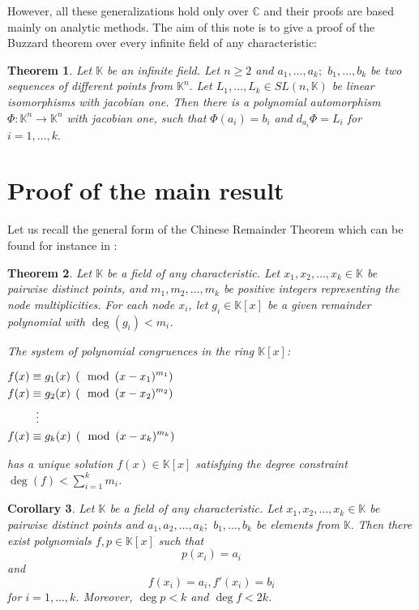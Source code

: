 \documentclass{amsart}
\newtheorem{theorem}{Theorem}[section]
\newtheorem{corollary}[theorem]{Corollary}
\newcommand{\C}{\mathbb{C}}
\newcommand{\K}{\mathbb{K}}
\begin{document}
However, all these generalizations hold only over $\C$ and their proofs are based mainly on analytic methods. The aim of this note is to give a proof of the Buzzard theorem over every
infinite field of any characteristic: \newpage


\begin{theorem}\label{glowne}
Let $\K$ be an infinite field. Let  $n\ge 2$ and $a_1,\ldots, a_k; $ $b_1,\ldots , b_k$ be two sequences of different points from $\K^n.$ Let $L_1,\ldots, L_k\in SL(n,\K)$ be linear isomorphisms with 
jacobian one. 
Then there is a polynomial automorphism $\Phi: \K^n\to \K^n$ with jacobian one, such that $\Phi(a_i)=b_i$ and $d_{a_i} \Phi= L_i$ for $i=1,\ldots, k.$
\end{theorem}




\section{Proof of the main result}

Let us recall the general form of the Chinese Remainder Theorem which can be found for instance in \cite[Section 5]{ksiazka}:


\begin{theorem}\label{hermite}
Let $\K$ be a field of any characteristic. Let $x_1, x_2, \dots, x_k \in \K$ be pairwise distinct points, and $m_1, m_2, \dots, m_k$ be positive integers representing the node multiplicities. For each node $x_{i}$, let   ${g_i} \in \K[x]$ be a given remainder polynomial with $\deg(g_i) < m_i$. 

The system of polynomial congruences in the ring $\K[x]$:

$\begin{aligned}f(x)&\equiv g_{1}(x)\mathinner{\;\left(\mod \,(x-x_{1})^{m_{1}}\right)}\\ f(x)&\equiv g_{2}(x)\mathinner{\;\left(\mod \,(x-x_{2})^{m_{2}}\right)}\\ &\;\;\vdots \\ f(x)&\equiv g_{k}(x)\mathinner{\;\left(\mod \,(x-x_{k})^{m_{k}}\right)}\end{aligned}$

has a unique solution $f(x) \in \K[x]$ satisfying the degree constraint  $\deg (f)<\sum _{i=1}^{k}m_{i}$.
\end{theorem}

\begin{corollary}\label{glowne}
Let $\K$ be a field of any characteristic. Let $x_1, x_2, \dots, x_k \in \K$ be pairwise distinct points and $a_1, a_2, \dots, a_k;$ $b_1,\dots, b_k$ be elements from $\K.$ 
Then there exist  polynomials $f, p \in \K[x]$ such that 
$$p(x_i)= a_i$$
and
$$f(x_i)=a_i, f'(x_i)=b_i$$
for $ i=1,\ldots, k$. Moreover, $\deg p <k$ and  $\deg f<2k$. %
\end{corollary}
\end{document}
